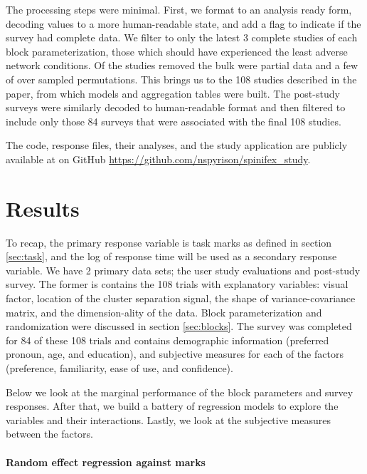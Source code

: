 \documentclass{monashthesis}
\begin{document}
The processing steps were minimal. First, we format to an analysis ready form, decoding values to a more human-readable state, and add a flag to indicate if the survey had complete data. We filter to only the latest 3 complete studies of each block parameterization, those which should have experienced the least adverse network conditions. Of the studies removed the bulk were partial data and a few of over sampled permutations. This brings us to the 108 studies described in the paper, from which models and aggregation tables were built. The post-study surveys were similarly decoded to human-readable format and then filtered to include only those 84 surveys that were associated with the final 108 studies.

The code, response files, their analyses, and the study application are publicly available at on GitHub \url{https://github.com/nspyrison/spinifex_study}.

\hypertarget{sec:results}{%
\section{Results}\label{sec:results}}

To recap, the primary response variable is task marks as defined in section \ref{sec:task}, and the log of response time will be used as a secondary response variable. We have 2 primary data sets; the user study evaluations and post-study survey. The former is contains the 108 trials with explanatory variables: visual factor, location of the cluster separation signal, the shape of variance-covariance matrix, and the dimension-ality of the data. Block parameterization and randomization were discussed in section \ref{sec:blocks}. The survey was completed for 84 of these 108 trials and contains demographic information (preferred pronoun, age, and education), and subjective measures for each of the factors (preference, familiarity, ease of use, and confidence).

Below we look at the marginal performance of the block parameters and survey responses. After that, we build a battery of regression models to explore the variables and their interactions. Lastly, we look at the subjective measures between the factors.

\hypertarget{random-effect-regression-against-marks}{%
\paragraph{Random effect regression against marks}\label{random-effect-regression-against-marks}}
\end{document}
